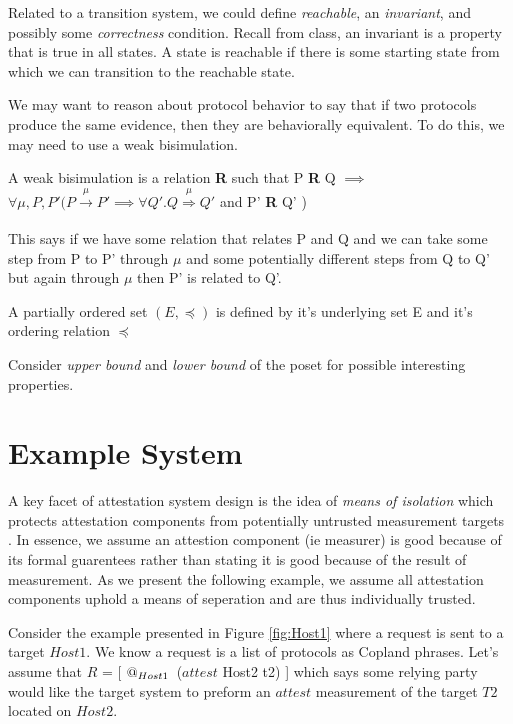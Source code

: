 \documentclass[12pt, letterpaper]{article}
\begin{document}
Related to a transition system, we could define \emph{reachable}, an \emph{invariant}, and possibly some \emph{correctness} condition. Recall from class, an invariant is a property that is true in all states. A state is reachable if there is some starting state from which we can transition to the reachable state. 

We may want to reason about protocol behavior to say that if two protocols produce the same evidence, then they are behaviorally equivalent. To do this, we may need to use a weak bisimulation. 

\begin{defn}
A weak bisimulation is a relation \textbf{R} such that P \textbf{R} Q $\implies$ $\forall \mu, P, P' (P \xrightarrow[]{\mu} P' \implies \forall Q'. Q \overset{\mu}\Rightarrow Q'$ and P' \textbf{R} Q' ) \cite{Milner} 
\end{defn}

This says if we have some relation that relates P and Q and we can take some step from P to P' through $\mu$ and some potentially different steps from Q to Q' but again through $\mu$ then P' is related to Q'.  

\begin{defn}
  A partially ordered set $(E, \preceq)$ is defined by it's underlying set E and it's ordering relation $\preceq$
\end{defn}

Consider \emph{upper bound} and \emph{lower bound} of the poset for possible interesting properties. 


\section{Example System}

A key facet of attestation system design is the idea of \emph{means of isolation} which protects attestation components from potentially untrusted measurement targets \cite{Petz::DesignandFormal::2021}. In essence, we assume an attestion component (ie measurer) is good because of its formal guarentees rather than stating it is good because of the result of measurement. As we present the following example, we assume all attestation components uphold a means of seperation and are thus individually trusted. 

Consider the example presented in Figure \ref{fig:Host1} where a request is sent to a target $Host1$. We know a request is a list of protocols as Copland phrases. Let's assume that $R$ = [ $\mathop{@_{Host1}}{} $ ($attest$ Host2 t2) ] which says some relying party would like the target system to preform an $attest$ measurement of the target $T2$ located on $Host2$. 
\end{document}

